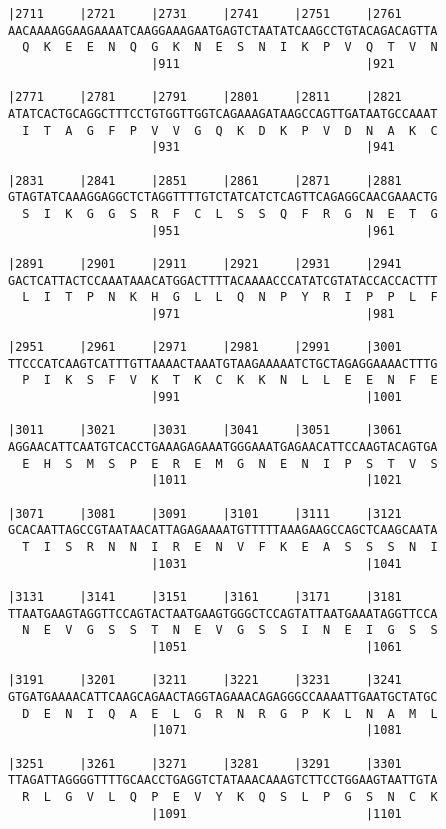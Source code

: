\documentclass{article}
\begin{document}
\begin{Verbatim}
|2711     |2721     |2731     |2741     |2751     |2761     
AACAAAAGGAAGAAAATCAAGGAAAGAATGAGTCTAATATCAAGCCTGTACAGACAGTTA
  Q  K  E  E  N  Q  G  K  N  E  S  N  I  K  P  V  Q  T  V  N
                    |911                          |921      
  
|2771     |2781     |2791     |2801     |2811     |2821     
ATATCACTGCAGGCTTTCCTGTGGTTGGTCAGAAAGATAAGCCAGTTGATAATGCCAAAT
  I  T  A  G  F  P  V  V  G  Q  K  D  K  P  V  D  N  A  K  C
                    |931                          |941      
  
|2831     |2841     |2851     |2861     |2871     |2881     
GTAGTATCAAAGGAGGCTCTAGGTTTTGTCTATCATCTCAGTTCAGAGGCAACGAAACTG
  S  I  K  G  G  S  R  F  C  L  S  S  Q  F  R  G  N  E  T  G
                    |951                          |961      
  
|2891     |2901     |2911     |2921     |2931     |2941     
GACTCATTACTCCAAATAAACATGGACTTTTACAAAACCCATATCGTATACCACCACTTT
  L  I  T  P  N  K  H  G  L  L  Q  N  P  Y  R  I  P  P  L  F
                    |971                          |981      
  
|2951     |2961     |2971     |2981     |2991     |3001     
TTCCCATCAAGTCATTTGTTAAAACTAAATGTAAGAAAAATCTGCTAGAGGAAAACTTTG
  P  I  K  S  F  V  K  T  K  C  K  K  N  L  L  E  E  N  F  E
                    |991                          |1001     
  
|3011     |3021     |3031     |3041     |3051     |3061     
AGGAACATTCAATGTCACCTGAAAGAGAAATGGGAAATGAGAACATTCCAAGTACAGTGA
  E  H  S  M  S  P  E  R  E  M  G  N  E  N  I  P  S  T  V  S
                    |1011                         |1021     
  
|3071     |3081     |3091     |3101     |3111     |3121     
GCACAATTAGCCGTAATAACATTAGAGAAAATGTTTTTAAAGAAGCCAGCTCAAGCAATA
  T  I  S  R  N  N  I  R  E  N  V  F  K  E  A  S  S  S  N  I
                    |1031                         |1041     
  
|3131     |3141     |3151     |3161     |3171     |3181     
TTAATGAAGTAGGTTCCAGTACTAATGAAGTGGGCTCCAGTATTAATGAAATAGGTTCCA
  N  E  V  G  S  S  T  N  E  V  G  S  S  I  N  E  I  G  S  S
                    |1051                         |1061     
  
|3191     |3201     |3211     |3221     |3231     |3241     
GTGATGAAAACATTCAAGCAGAACTAGGTAGAAACAGAGGGCCAAAATTGAATGCTATGC
  D  E  N  I  Q  A  E  L  G  R  N  R  G  P  K  L  N  A  M  L
                    |1071                         |1081     
  
|3251     |3261     |3271     |3281     |3291     |3301     
TTAGATTAGGGGTTTTGCAACCTGAGGTCTATAAACAAAGTCTTCCTGGAAGTAATTGTA
  R  L  G  V  L  Q  P  E  V  Y  K  Q  S  L  P  G  S  N  C  K
                    |1091                         |1101     
  

\end{Verbatim}
\end{document}
